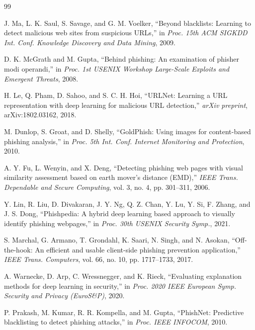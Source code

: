 \documentclass[12pt,a4paper]{report}
\begin{document}
\begin{thebibliography}{99}

J. Ma, L. K. Saul, S. Savage, and G. M. Voelker, ``Beyond blacklists: Learning to detect malicious web sites from suspicious URLs,'' in \textit{Proc. 15th ACM SIGKDD Int. Conf. Knowledge Discovery and Data Mining}, 2009.

D. K. McGrath and M. Gupta, ``Behind phishing: An examination of phisher modi operandi,'' in \textit{Proc. 1st USENIX Workshop Large-Scale Exploits and Emergent Threats}, 2008.

H. Le, Q. Pham, D. Sahoo, and S. C. H. Hoi, ``URLNet: Learning a URL representation with deep learning for malicious URL detection,'' \textit{arXiv preprint}, arXiv:1802.03162, 2018.

M. Dunlop, S. Groat, and D. Shelly, ``GoldPhish: Using images for content-based phishing analysis,'' in \textit{Proc. 5th Int. Conf. Internet Monitoring and Protection}, 2010.

A. Y. Fu, L. Wenyin, and X. Deng, ``Detecting phishing web pages with visual similarity assessment based on earth mover's distance (EMD),'' \textit{IEEE Trans. Dependable and Secure Computing}, vol. 3, no. 4, pp. 301--311, 2006.

Y. Lin, R. Liu, D. Divakaran, J. Y. Ng, Q. Z. Chan, Y. Lu, Y. Si, F. Zhang, and J. S. Dong, ``Phishpedia: A hybrid deep learning based approach to visually identify phishing webpages,'' in \textit{Proc. 30th USENIX Security Symp.}, 2021.

S. Marchal, G. Armano, T. Grondahl, K. Saari, N. Singh, and N. Asokan, ``Off-the-hook: An efficient and usable client-side phishing prevention application,'' \textit{IEEE Trans. Computers}, vol. 66, no. 10, pp. 1717--1733, 2017.

A. Warnecke, D. Arp, C. Wressnegger, and K. Rieck, ``Evaluating explanation methods for deep learning in security,'' in \textit{Proc. 2020 IEEE European Symp. Security and Privacy (EuroS\&P)}, 2020.

P. Prakash, M. Kumar, R. R. Kompella, and M. Gupta, ``PhishNet: Predictive blacklisting to detect phishing attacks,'' in \textit{Proc. IEEE INFOCOM}, 2010.


\end{thebibliography}
\end{document}
